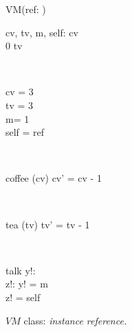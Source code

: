 \begin{figure}[H]
\centering
\begin{class}{VM(ref: \integer)}
\\
\begin{state}
cv, tv, m, self: \integer
{} \leq  cv 
\\
0 \leq  tv 
\end{state} 
\\
\begin{init}
cv = 3
\\tv = 3
\\ m= 1
\\self = ref
\end{init} 
\\
\begin{op}{coffee}
\Delta (cv)
\ST
cv' = cv - 1
\end{op}
\\
\begin{op}{tea}
\Delta (tv)
\ST
tv' = tv - 1
\end{op}
\\
\begin{op}{talk}
y!: \integer
\\z!: \integer
\ST
y! = m
\\z! = self
\end{op}
\end{class}
\caption{$VM$ class: \textit{instance reference.}}
\label{oz_vm_reference_name}
\end{figure}